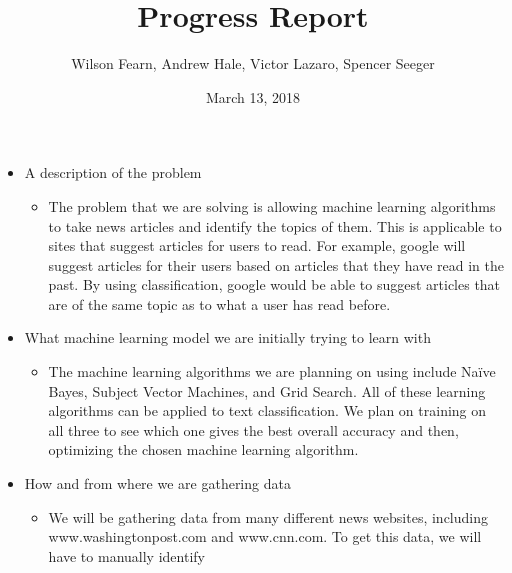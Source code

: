 \documentclass[fleqn,11pt]{article}
\begin{document}
  \lstset{
    language=Python,
    basicstyle=\small,          %
    keywordstyle=\bfseries,
    identifierstyle=,           %
    commentstyle=,              %
    stringstyle=\ttfamily,      %
    showstringspaces=false,     %
    numbers=left,
    numberstyle=\tiny,
    numbersep=5pt,
    frame=tb,
  }

  \title{Progress Report}
  \author{Wilson Fearn, Andrew Hale, Victor Lazaro, Spencer Seeger}
  \date{March 13, 2018}
  \maketitle

  \begin{itemize}
    \item A description of the problem
      \begin{itemize}
        \item The problem that we are solving is allowing machine learning algorithms to take news 
        articles and identify the topics of them. This is applicable to sites that suggest articles 
        for users to read. For example, google will suggest articles for their users based on articles 
        that they have read in the past. By using classification, google would be able to suggest 
        articles that are of the same topic as to what a user has read before.
      \end{itemize}
    \item What machine learning model we are initially trying to learn with
      \begin{itemize}
        \item The machine learning algorithms we are planning on using include Na{\"i}ve Bayes, Subject 
        Vector Machines, and Grid Search. All of these learning algorithms can be applied to text 
        classification. We plan on training on all three to see which one gives the best overall accuracy 
        and then, optimizing the chosen machine learning algorithm.
      \end{itemize}
    \item How and from where we are gathering data
      \begin{itemize}
        \item We will be gathering data from many different news websites, including 
        www.washingtonpost.com and www.cnn.com. To get this data, we will have to manually identify 

\end{itemize}
\end{itemize}
\end{document}

